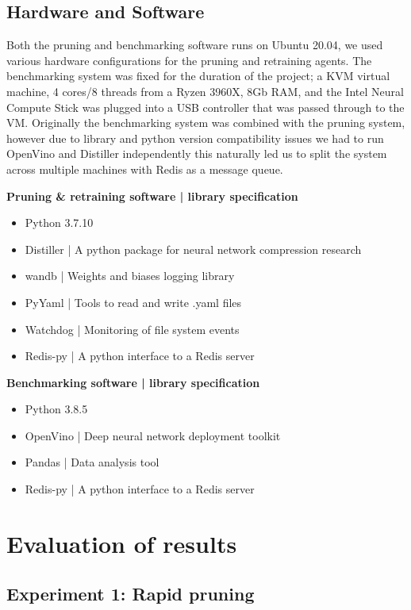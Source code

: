 \documentclass[../Dissertation.tex]{subfiles}
\begin{document}
\subsection{Hardware and Software}
Both the pruning and benchmarking software runs on Ubuntu 20.04, we used various hardware configurations for the pruning and retraining agents. 
The benchmarking system was fixed for the duration of the project; a KVM virtual machine, 4 cores/8 threads from a Ryzen 3960X, 8Gb RAM, and the Intel Neural Compute Stick was plugged into a USB controller that was passed through to the VM.
Originally the benchmarking system was combined with the pruning system, however due to library and python version compatibility issues we had to run OpenVino and Distiller independently this naturally led us to split the system across multiple machines with Redis as a message queue.


\noindent\textbf{Pruning \& retraining software | library specification}
\begin{itemize}
    \item Python 3.7.10
    \item Distiller | A python package for neural network compression research
    \item wandb | Weights and biases logging library
    \item PyYaml | Tools to read and write .yaml files
    \item Watchdog | Monitoring of file system events
    \item Redis-py | A python interface to a Redis server
\end{itemize}

\noindent\textbf{Benchmarking software | library specification}
\begin{itemize}
    \item Python 3.8.5
    \item OpenVino | Deep neural network deployment toolkit
    \item Pandas | Data analysis tool
    \item Redis-py | A python interface to a Redis server
\end{itemize}



\section{Evaluation of results}

\subsection{Experiment 1: Rapid pruning}\label{sec:FastPruningPhase}
\end{document}
